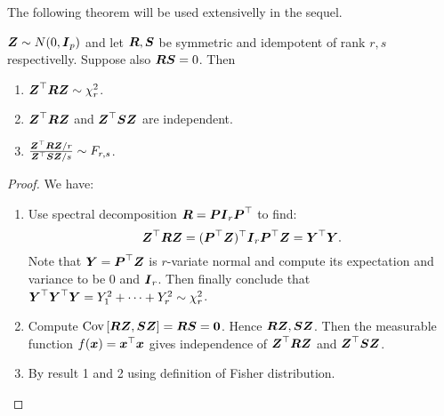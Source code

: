 The following theorem will be used extensivelly in the sequel. 
\begin{theorem}
    $\boldsymbol{Z}\sim N(0, \boldsymbol{I}_p)$ and let $\boldsymbol{R}, \boldsymbol{S}$ be symmetric and idempotent of rank $r, s$ respectivelly. Suppose also $\boldsymbol{RS}=0$. Then 
    \begin{enumerate}
        \item $\boldsymbol{Z}^\top \boldsymbol{R} \boldsymbol{Z} \sim \chi^2_r$.
        \item $\boldsymbol{Z}^\top \boldsymbol{R} \boldsymbol{Z}$ and $\boldsymbol{Z}^\top \boldsymbol{S} \boldsymbol{Z}$ are independent.
        \item $\frac{\boldsymbol{Z}^\top \boldsymbol{R} \boldsymbol{Z} / r}{\boldsymbol{Z}^\top \boldsymbol{S} \boldsymbol{Z}/s} \sim F_{r,s}$.
    \end{enumerate}
\end{theorem}
\begin{proof} We have:
    \begin{enumerate}
        \item Use spectral decomposition $\boldsymbol{R} = \boldsymbol{P}\boldsymbol{I}_r \boldsymbol{P}^\top$ to find:
        $$
            \boldsymbol{Z}^\top\boldsymbol{R}\boldsymbol{Z} 
            = (\boldsymbol{P}^\top\boldsymbol{Z})^\top \boldsymbol{I}_r \boldsymbol{P}^\top\boldsymbol{Z}
            = \boldsymbol{Y}^\top \boldsymbol{Y}.
        $$
        Note that $\boldsymbol{Y}=\boldsymbol{P}^\top\boldsymbol{Z}$ is $r$-variate normal and compute its expectation and variance to be $0$ and $\boldsymbol{I}_r$. Then finally conclude that $\boldsymbol{Y}^\top \boldsymbol{Y}^\top\boldsymbol{Y}=Y_1^2+\dots+Y_r^2\sim\chi^2_r$.
        \item Compute $\mathrm{Cov}\left[\boldsymbol{R}\boldsymbol{Z}, \boldsymbol{S}\boldsymbol{Z}\right] = \boldsymbol{R}\boldsymbol{S} = \boldsymbol{0}$. Hence $\boldsymbol{R}\boldsymbol{Z}, \boldsymbol{S}\boldsymbol{Z}$. Then the measurable function $f(\boldsymbol{x})=\boldsymbol{x}^\top \boldsymbol{x}$ gives independence of $\boldsymbol{Z}^\top \boldsymbol{R} \boldsymbol{Z}$ and $\boldsymbol{Z}^\top \boldsymbol{S} \boldsymbol{Z}$.
        \item By result 1 and 2 using definition of Fisher distribution.
    \end{enumerate}
\end{proof}


